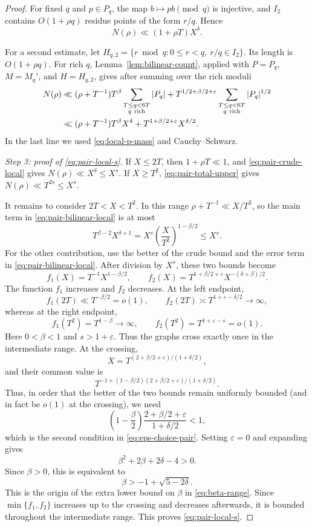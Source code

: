 \documentclass[10pt,a4paper]{amsart}
\newcommand{\eps}{\varepsilon}
\begin{document}
\begin{proof}
For fixed $q$ and $p\in P_q$, the map $b\mapsto pb\pmod q$ is injective, and
$I_2$ contains $O(1+\rho q)$ residue points of the form $r/q$.  Hence
\begin{equation}\label{eq:pair-crude-local}
 N(\rho)\ll (1+\rho T)X^\delta.
\end{equation}

For a second estimate, let
$H_{q,2}=\{r\bmod q:0\le r<q,\ r/q\in I_2\}$.  Its length is $O(1+\rho q)$.
For rich $q$, Lemma~\ref{lem:bilinear-count}, applied with $P=P_q$,
$M=M_q'$, and $H=H_{q,2}$, gives after summing over the rich moduli
\begin{align}
 N(\rho)
 &\ll (\rho+T^{-1})T^\beta\sum_{\substack{T\le q<6T\\q\ \mathrm{rich}}}|P_q|
 +T^{1/2+\beta/2+\eps}\sum_{\substack{T\le q<6T\\q\ \mathrm{rich}}}|P_q|^{1/2}\notag\\
 &\ll (\rho+T^{-1})T^\beta X^\delta
 +T^{1+\beta/2+\eps}X^{\delta/2}.
 \label{eq:pair-bilinear-local}
\end{align}
In the last line we used \eqref{eq:local-p-mass} and Cauchy--Schwarz.

\medskip
\noindent\emph{Step 3: proof of \eqref{eq:pair-local-s}.}
If $X\le2T$, then $1+\rho T\ll1$, and \eqref{eq:pair-crude-local} gives
$N(\rho)\ll X^\delta\le X^s$.  If $X\ge T^2$, \eqref{eq:pair-total-upper} gives
$N(\rho)\ll T^{2s}\le X^s$.

It remains to consider $2T<X<T^2$.  In this range
$\rho+T^{-1}\ll X/T^2$, so the main term in
\eqref{eq:pair-bilinear-local} is at most
$$
 T^{\beta-2}X^{\delta+1}
 =X^s\left(\frac{X}{T^2}\right)^{1-\beta/2}
 \le X^s.
$$
For the other contribution, use the better of the crude bound and the error
term in \eqref{eq:pair-bilinear-local}.  After division by $X^s$, these two
bounds become
$$
 f_1(X)=T^{-1}X^{1-\beta/2},
 \qquad
 f_2(X)=T^{1+\beta/2+\eps}X^{-(\delta+\beta)/2}.
$$
The function $f_1$ increases and $f_2$ decreases.  At the left endpoint,
$$
 f_1(2T)\ll T^{-\beta/2}=o(1),
 \qquad
 f_2(2T)\asymp T^{1+\eps-\delta/2}\to\infty,
$$
whereas at the right endpoint,
$$
 f_1(T^2)=T^{1-\beta}\to\infty,
 \qquad
 f_2(T^2)=T^{1+\eps-s}=o(1).
$$
Here $0<\beta<1$ and $s>1+\eps$.  Thus the graphs cross exactly once in the
intermediate range.  At the crossing,
$$
 X=T^{(2+\beta/2+\eps)/(1+\delta/2)},
$$
and their common value is
$$
 T^{-1+(1-\beta/2)(2+\beta/2+\eps)/(1+\delta/2)}.
$$
Thus, in order that the better of the two bounds remain uniformly bounded
(and in fact be $o(1)$ at the crossing), we need
$$
 \left(1-\frac\beta2\right)
 \frac{2+\beta/2+\eps}{1+\delta/2}<1,
$$
which is the second condition in \eqref{eq:eps-choice-pair}.  Setting
$\eps=0$ and expanding gives
$$
 \beta^2+2\beta+2\delta-4>0.
$$
Since $\beta>0$, this is equivalent to
$$
 \beta>-1+\sqrt{5-2\delta}.
$$
This is the origin of the extra lower bound on $\beta$ in \eqref{eq:beta-range}.
Since $\min\{f_1,f_2\}$ increases up to the crossing and decreases afterwards,
it is bounded throughout the intermediate range.  This proves
\eqref{eq:pair-local-s}.


\end{proof}
\end{document}
